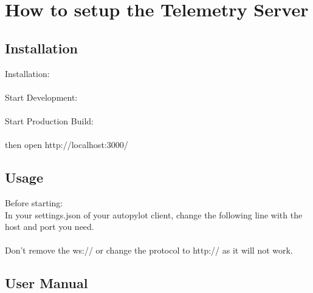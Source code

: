 \documentclass[12pt]{article}
\begin{document}
\section{How to setup the Telemetry Server}

\subsection{Installation}

Installation:\\

\noindent{}\\

Start Development:\\

\noindent{}\\

Start Production Build:\\

\noindent{}\\

then open http://localhost:3000/ \\

\subsection{Usage}

Before starting:\\

In your settings.json of your autopylot client, change the following line with the host and port you need.\\

\noindent{}\\

Don't remove the ws:// or change the protocol to http:// as it will not work.\\


\subsection{User Manual}
\end{document}
